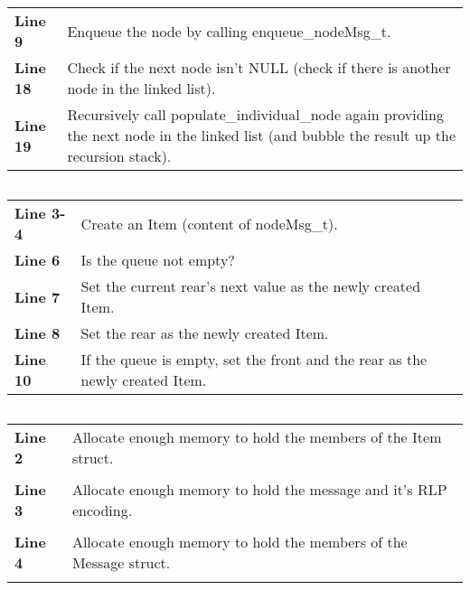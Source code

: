 \documentclass[a4paper, 12pt, titlepage]{article}
\newenvironment{code}{\captionsetup{type=listing}}{}
\newcommand{\sourcecode}[3]{
    \begin{code}
      \inputminted[linenos,numbersep=5pt,gobble=0,frame=lines,framesep=2mm,]{c}{#1}
        \caption{#2}
        \label{lst: #3}
    \end{code}
}
\begin{document}
\begin{onehalfspacing}
\begin{longtable}{l p{10cm}}
     \textbf{Line 9} & Enqueue the node by calling enqueue\_nodeMsg\_t.  \\

     \textbf{Line 18} & Check if the next node isn't NULL (check if there is another node in the linked list).  \\

     \textbf{Line 19} & Recursively call populate\_individual\_node again providing the next node in the linked list (and bubble the result up the recursion stack).  \\

  \end{longtable}

  \clearpage

   \sourcecode{snippets/task2b/enqueue_nodeMsg_t.c}{enqueue\_nodeMsg\_t helper function}{enqueue_nodeMsg_t}

   \begin{longtable}{l p{10cm}}
     \textbf{Line 3-4} & Create an Item (content of nodeMsg\_t). \\

     \textbf{Line 6} & Is the queue not empty?\\

     \textbf{Line 7} & Set the current rear's next value as the newly created Item.  \\

     \textbf{Line 8} & Set the rear as the newly created Item.\\

     \textbf{Line 10} & If the queue is empty, set the front and the rear as the newly created Item.\\

   \end{longtable}

   \clearpage

   \sourcecode{snippets/task2b/create_item.c}{create\_item helper function}{create_item}

   \begin{longtable}{l p{10cm}}
     \textbf{Line 2} & Allocate enough memory to hold the members of the Item struct. \\ \\

     \textbf{Line 3} & Allocate enough memory to hold the message and it's RLP encoding.\\ \\

     \textbf{Line 4} & Allocate enough memory to hold the members of the Message struct.  \\ \\


\end{longtable}
\end{onehalfspacing}
\end{document}
